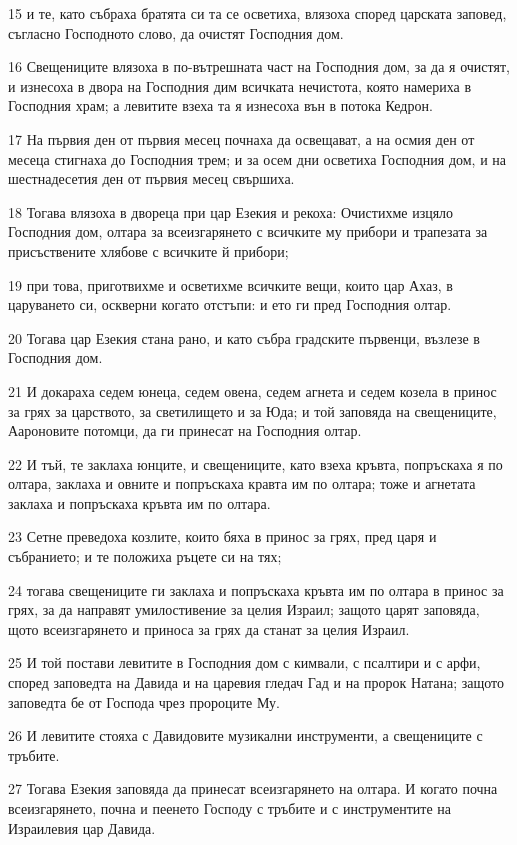 \par 15 и те, като събраха братята си та се осветиха, влязоха според царската заповед, съгласно Господното слово, да очистят Господния дом.
\par 16 Свещениците влязоха в по-вътрешната част на Господния дом, за да я очистят, и изнесоха в двора на Господния дим всичката нечистота, която намериха в Господния храм; а левитите взеха та я изнесоха вън в потока Кедрон.
\par 17 На първия ден от първия месец почнаха да освещават, а на осмия ден от месеца стигнаха до Господния трем; и за осем дни осветиха Господния дом, и на шестнадесетия ден от първия месец свършиха.
\par 18 Тогава влязоха в двореца при цар Езекия и рекоха: Очистихме изцяло Господния дом, олтара за всеизгарянето с всичките му прибори и трапезата за присъствените хлябове с всичките й прибори;
\par 19 при това, приготвихме и осветихме всичките вещи, които цар Ахаз, в царуването си, оскверни когато отстъпи: и ето ги пред Господния олтар.
\par 20 Тогава цар Езекия стана рано, и като събра градските първенци, възлезе в Господния дом.
\par 21 И докараха седем юнеца, седем овена, седем агнета и седем козела в принос за грях за царството, за светилището и за Юда; и той заповяда на свещениците, Аароновите потомци, да ги принесат на Господния олтар.
\par 22 И тъй, те заклаха юнците, и свещениците, като взеха кръвта, попръскаха я по олтара, заклаха и овните и попръскаха кравта им по олтара; тоже и агнетата заклаха и попръскаха кръвта им по олтара.
\par 23 Сетне преведоха козлите, които бяха в принос за грях, пред царя и събранието; и те положиха ръцете си на тях;
\par 24 тогава свещениците ги заклаха и попръскаха кръвта им по олтара в принос за грях, за да направят умилостивение за целия Израил; защото царят заповяда, щото всеизгарянето и приноса за грях да станат за целия Израил.
\par 25 И той постави левитите в Господния дом с кимвали, с псалтири и с арфи, според заповедта на Давида и на царевия гледач Гад и на пророк Натана; защото заповедта бе от Господа чрез пророците Му.
\par 26 И левитите стояха с Давидовите музикални инструменти, а свещениците с тръбите.
\par 27 Тогава Езекия заповяда да принесат всеизгарянето на олтара. И когато почна всеизгарянето, почна и пеенето Господу с тръбите и с инструментите на Израилевия цар Давида.
